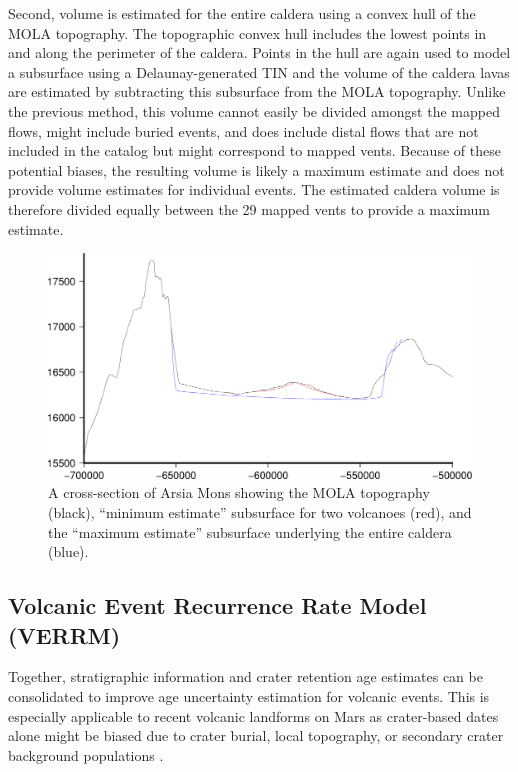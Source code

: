 \documentclass[12pt,letter]{article}
\begin{document}
Second, volume is estimated for the entire caldera using a convex hull of the MOLA topography. The topographic convex hull includes the lowest points in and along the perimeter of the caldera. Points in the hull are again used to model a subsurface using a Delaunay-generated TIN and the volume of the caldera lavas are estimated by subtracting this subsurface from the MOLA topography. Unlike the previous method, this volume cannot easily be divided amongst the mapped flows, might include buried events, and does include distal flows that are not included in the catalog but might correspond to mapped vents. Because of these potential biases, the resulting volume is likely a maximum estimate and does not provide volume estimates for individual events. The estimated caldera volume is therefore divided equally between the 29 mapped vents to provide a maximum estimate.

\begin{figure}
\centering
\includegraphics[width=0.6\linewidth]{figures/vol_estimation_cross.png}
\caption{A cross-section of Arsia Mons showing the MOLA topography (black), ``minimum estimate'' subsurface for two volcanoes (red), and the ``maximum estimate'' subsurface underlying the entire caldera (blue).}
\label{fig_crosssection}
\end{figure}


\subsection{Volcanic Event Recurrence Rate Model (VERRM)}

Together, stratigraphic information and crater retention age estimates can be consolidated to improve age uncertainty estimation for volcanic events. This is especially applicable to recent volcanic landforms on Mars as crater-based dates alone might be biased due to crater burial, local topography, or secondary crater background populations \citep{robbins2011volcanic,platz2011eruption}.
\end{document}
